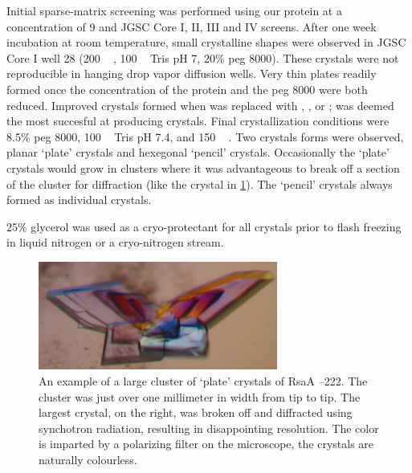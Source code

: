 Initial sparse-matrix screening was performed using our protein at a
concentration of 9 \mgperml and JGSC Core I, II, III and IV screens. %
 After one week incubation at room temperature, small crystalline shapes were
observed in JGSC Core I well 28 (200 \si{\milli\molar}  , 100 \si{\milli\molar} Tris pH 7, 20\% \ac{peg}
8000). These crystals were not reproducible in hanging drop vapor
diffusion wells. Very thin plates readily formed once the concentration
of the protein and the \ac{peg} 8000 were both reduced. Improved crystals
formed when  was replaced with , , or ;  was
deemed the most succesful at producing crystals. Final crystallization
conditions were 8.5\% \ac{peg} 8000, 100 \si{\milli\molar} Tris pH 7.4, and 150 \si{\milli\molar} .
Two crystals forms were observed, planar `plate' crystals and hexegonal
`pencil' crystals. Occasionally the `plate' crystals would grow in clusters where it was advantageous to break off a section of the cluster for diffraction (like the crystal in \cref{fig:crystal-flower}). The `pencil' crystals always formed as individual crystals.

 25\% glycerol was used as a cryo-protectant for all
crystals prior to flash freezing in liquid nitrogen or a cryo-nitrogen stream.

\begin{figure}[p]
  	\begin{center}
   		\includegraphics[width=0.7\textwidth]{crystal_chapter/img/bigflowerxtal.jpg}
   	\end{center}
   	\caption[Example of a large cluster of `plate' RsaA --222 crystals]{An example of a large cluster of `plate' crystals of RsaA --222. The cluster was just over one millimeter in width from tip to tip. The largest crystal, on the right, was broken off and diffracted using synchotron radiation, resulting in disappointing resolution. The color is imparted by a polarizing filter on the microscope, the crystals are naturally colourless.}
   	\label{fig:crystal-flower}
\end{figure}

